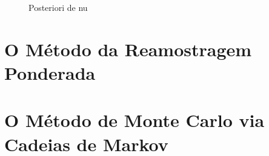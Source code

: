 \documentclass[12pt,reqno,a4paper,oneside]{report}
\begin{document}
\begin{figure}[!htb]
	\centering
	\caption{Posteriori de nu}
	\label{fig:post_nu}
\end{figure}

\section*{\Large O Método da Reamostragem Ponderada}


\section*{\Large O Método de Monte Carlo via Cadeias de Markov}



%
\end{document}
